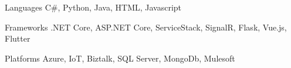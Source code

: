 
\begin{cvskills}
  \cvskill
    {Languages} %
    {C\#, Python, Java, HTML, Javascript} %

  \cvskill
    {Frameworks} %
    {.NET Core, ASP.NET Core, ServiceStack, SignalR, Flask, Vue.js, Flutter} %
    
  \cvskill
    {Platforms}
    {Azure, IoT, Biztalk, SQL Server, MongoDb, Mulesoft}
\end{cvskills}
